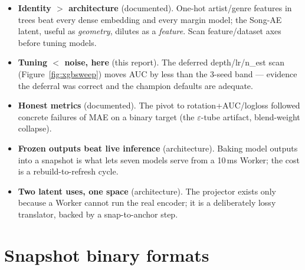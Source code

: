 \documentclass[11pt]{article}
\begin{document}
\begin{itemize}[leftmargin=1.4em,itemsep=3pt]
\item \textbf{Identity $>$ architecture} (documented). One-hot artist/genre features in trees beat
every dense embedding and every margin model; the Song-AE latent, useful as \emph{geometry}, dilutes
as a \emph{feature}. Scan feature/dataset axes before tuning models.
\item \textbf{Tuning $<$ noise, here} (this report). The deferred depth/lr/n\_est scan
(Figure~\ref{fig:xgbsweep}) moves AUC by less than the 3-seed band --- evidence the deferral was
correct and the champion defaults are adequate.
\item \textbf{Honest metrics} (documented). The pivot to rotation{+}AUC/logloss followed concrete
failures of MAE on a binary target (the $\varepsilon$-tube artifact, blend-weight collapse).
\item \textbf{Frozen outputs beat live inference} (architecture). Baking model outputs into a snapshot
is what lets seven models serve from a 10\,ms Worker; the cost is a rebuild-to-refresh cycle.
\item \textbf{Two latent uses, one space} (architecture). The projector exists only because a Worker
cannot run the real encoder; it is a deliberately lossy translator, backed by a snap-to-anchor step.
\end{itemize}

\appendix
\section{Snapshot binary formats}
\label{app:formats}
\end{document}
